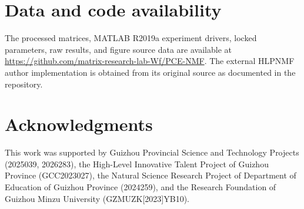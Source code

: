 \documentclass[preprint,12pt]{elsarticle}
\theoremstyle{remark}
\begin{document}
\section*{Data and code availability}

The processed matrices, MATLAB R2019a experiment drivers, locked
parameters, raw results, and figure source data are available at
\url{https://github.com/matrix-research-lab-Wf/PCE-NMF}.
The external HLPNMF author implementation is obtained from its
original source as documented in the repository.

\section*{Acknowledgments}
This work was supported by Guizhou Provincial Science and Technology Projects (2025039, 2026283), the High-Level Innovative Talent Project of Guizhou Province (GCC2023027), the Natural Science Research Project of Department of Education of Guizhou Province (2024259), and the Research Foundation of Guizhou Minzu University (GZMUZK[2023]YB10).
\end{document}
